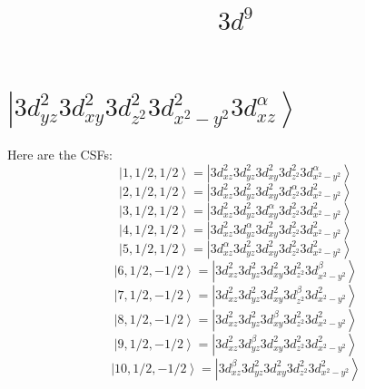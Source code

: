 \documentclass[11pt]{article}
\title{$3d^{9}$}
\begin{document}
\maketitle
\section{$\left|3d_{yz}^{2}3d_{xy}^{2}3d_{z^2}^{2}3d_{x^2-y^2}^{2}3d_{xz}^{\alpha}\right\rangle$}

Here are the CSFs:\newline\newline
\begin{equation*}
\left|1,1/2,1/2\right>=\left|3d_{xz}^{2}3d_{yz}^{2}3d_{xy}^{2}3d_{z^2}^{2}3d_{x^2-y^2}^{\alpha}\right>\end{equation*}
\begin{equation*}
\left|2,1/2,1/2\right>=\left|3d_{xz}^{2}3d_{yz}^{2}3d_{xy}^{2}3d_{z^2}^{\alpha}3d_{x^2-y^2}^{2}\right>\end{equation*}
\begin{equation*}
\left|3,1/2,1/2\right>=\left|3d_{xz}^{2}3d_{yz}^{2}3d_{xy}^{\alpha}3d_{z^2}^{2}3d_{x^2-y^2}^{2}\right>\end{equation*}
\begin{equation*}
\left|4,1/2,1/2\right>=\left|3d_{xz}^{2}3d_{yz}^{\alpha}3d_{xy}^{2}3d_{z^2}^{2}3d_{x^2-y^2}^{2}\right>\end{equation*}
\begin{equation*}
\left|5,1/2,1/2\right>=\left|3d_{xz}^{\alpha}3d_{yz}^{2}3d_{xy}^{2}3d_{z^2}^{2}3d_{x^2-y^2}^{2}\right>\end{equation*}
\begin{equation*}
\left|6,1/2,-1/2\right>=\left|3d_{xz}^{2}3d_{yz}^{2}3d_{xy}^{2}3d_{z^2}^{2}3d_{x^2-y^2}^{\beta}\right>\end{equation*}
\begin{equation*}
\left|7,1/2,-1/2\right>=\left|3d_{xz}^{2}3d_{yz}^{2}3d_{xy}^{2}3d_{z^2}^{\beta}3d_{x^2-y^2}^{2}\right>\end{equation*}
\begin{equation*}
\left|8,1/2,-1/2\right>=\left|3d_{xz}^{2}3d_{yz}^{2}3d_{xy}^{\beta}3d_{z^2}^{2}3d_{x^2-y^2}^{2}\right>\end{equation*}
\begin{equation*}
\left|9,1/2,-1/2\right>=\left|3d_{xz}^{2}3d_{yz}^{\beta}3d_{xy}^{2}3d_{z^2}^{2}3d_{x^2-y^2}^{2}\right>\end{equation*}
\begin{equation*}
\left|10,1/2,-1/2\right>=\left|3d_{xz}^{\beta}3d_{yz}^{2}3d_{xy}^{2}3d_{z^2}^{2}3d_{x^2-y^2}^{2}\right>\end{equation*}
\end{document}
